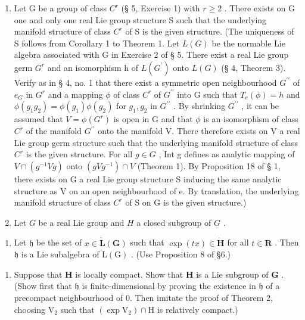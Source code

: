 \begin{enumerate}
\def\labelenumi{\arabic{enumi}.}
\setcounter{enumi}{5}
\item
  Let G be a group of class \(C^{r}\) (§ 5, Exercise 1) with \(r \geqslant 2\) . There exists on G one and only one real Lie group structure S such that the underlying manifold structure of class \(C^{r}\) of S is the given structure. (The uniqueness of S follows from Corollary 1 to Theorem 1. Let \(L(G)\) be the normable Lie algebra associated with G in Exercise 2 of § 5. There exist a real Lie group germ \(G^{r}\) and an isomorphism h of \(L(G^{\prime})\) onto \(L(G)\) (§ 4, Theorem 3). Verify as in § 4, no. 1 that there exist a symmetric open neighbourhood \(G^{\prime\prime}\) of \(e_{G}\) in \(G^{r}\) and a mapping \(\phi\) of class \(C^{r}\) of \(G^{\prime\prime}\) into G such that \(T_{e}(\phi) = h\) and \(\phi(g_{1}g_{2}) = \phi(g_{1})\phi(g_{2})\) for \(g_{1}, g_{2}\) in \(G^{\prime\prime}\) . By shrinking \(G^{\prime\prime}\) , it can be assumed that \(V = \phi(G^{r})\) is open in G and that \(\phi\) is an isomorphism of class \(C^{r}\) of the manifold \(G^{\prime\prime}\) onto the manifold V. There therefore exists on V a real Lie group germ structure such that the underlying manifold structure of class \(C^{r}\) is the given structure. For all \(g \in G\) , Int g defines as analytic mapping of \(V \cap (g^{-1}Vg)\) onto \((gVg^{-1}) \cap V\) (Theorem 1). By Proposition 18 of § 1, there exists on G a real Lie group structure S inducing the same analytic structure as V on an open neighbourhood of e. By translation, the underlying manifold structure of class \(C^{r}\) of S on G is the given structure.)
\item
  Let \(G\) be a real Lie group and \(H\) a closed subgroup of \(G\) .
\end{enumerate}

\begin{enumerate}
\def\labelenumi{(\alph{enumi})}
\tightlist
\item
  Let \(\mathfrak{h}\) be the set of \(x\in \dot{\mathbf{L}} (\mathbf{G})\) such that \(\exp (tx)\in \dot{\mathbf{H}}\) for all \(t\in \mathbf{R}\) . Then \(\mathfrak{h}\) is a Lie subalgebra of \(\mathrm{L}(\mathrm{G})\) . (Use Proposition 8 of §6.)
\end{enumerate}

\begin{enumerate}
\def\labelenumi{(\alph{enumi})}
\setcounter{enumi}{1}
\tightlist
\item
  Suppose that \(\mathbf{H}\) is locally compact. Show that \(\mathbf{H}\) is a Lie subgroup of \(\mathbf{G}\) . (Show first that \(\mathfrak{h}\) is finite-dimensional by proving the existence in \(\mathfrak{h}\) of a precompact neighbourhood of 0. Then imitate the proof of Theorem 2, choosing \(\mathrm{V}_2\) such that \((\exp \mathrm{V}_2) \cap \mathrm{H}\) is relatively compact.)
\end{enumerate}


